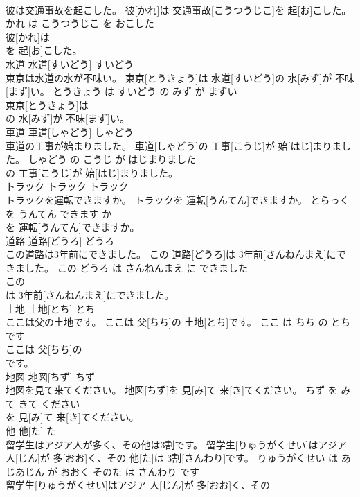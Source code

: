 \documentclass[8pt]{extreport}
\begin{document}
\begin{CJK}{UTF8}{min}
\\	彼は交通事故を起こした。	彼[かれ]は 交通事故[こうつうじこ]を 起[お]こした。	かれ は こうつうじこ を おこした	
\\	彼[かれ]は
\\	を 起[お]こした。		
\\	水道	水道[すいどう]	すいどう	
\\	東京は水道の水が不味い。	東京[とうきょう]は 水道[すいどう]の 水[みず]が 不味[まず]い。	とうきょう は すいどう の みず が まずい	
\\	東京[とうきょう]は
\\	の 水[みず]が 不味[まず]い。		
\\	車道	車道[しゃどう]	しゃどう	
\\	車道の工事が始まりました。	車道[しゃどう]の 工事[こうじ]が 始[はじ]まりました。	しゃどう の こうじ が はじまりました	
\\	の 工事[こうじ]が 始[はじ]まりました。		
\\	トラック	トラック	トラック	
\\	トラックを運転できますか。	トラックを 運転[うんてん]できますか。	とらっく を うんてん できます か	
\\	を 運転[うんてん]できますか。		
\\	道路	道路[どうろ]	どうろ	
\\	この道路は3年前にできました。	この 道路[どうろ]は 3年前[さんねんまえ]にできました。	この どうろ は さんねんまえ に できました	
\\	この
\\	は 3年前[さんねんまえ]にできました。		
\\	土地	土地[とち]	とち	
\\	ここは父の土地です。	ここは 父[ちち]の 土地[とち]です。	ここ は ちち の とち です	
\\	ここは 父[ちち]の
\\	です。		
\\	地図	地図[ちず]	ちず	
\\	地図を見て来てください。	地図[ちず]を 見[み]て 来[き]てください。	ちず を みて きて ください	
\\	を 見[み]て 来[き]てください。		
\\	他	他[た]	た	
\\	留学生はアジア人が多く、その他は3割です。	留学生[りゅうがくせい]はアジア 人[じん]が 多[おお]く、その 他[た]は 3割[さんわり]です。	りゅうがくせい は あじあじん が おおく そのた は さんわり です	
\\	留学生[りゅうがくせい]はアジア 人[じん]が 多[おお]く、その

\end{CJK}
\end{document}
